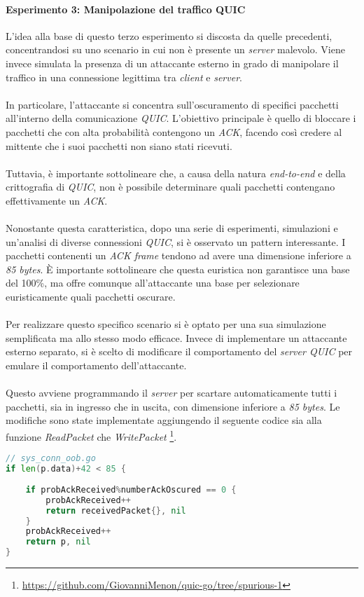 \paragraph{Esperimento 3: Manipolazione del traffico QUIC }
\noindent L'idea alla base di questo terzo esperimento si discosta da quelle precedenti, concentrandosi su uno scenario in cui non è presente un \emph{server} malevolo.
Viene invece simulata la presenza di un attaccante esterno in grado di manipolare il traffico in una connessione legittima tra \emph{client} e \emph{server}.
\\\\
In particolare, l'attaccante si concentra sull'oscuramento di specifici pacchetti all'interno della comunicazione \emph{QUIC}. 
L'obiettivo principale è quello di bloccare i pacchetti che con alta probabilità contengono un \emph{ACK}, facendo così credere al mittente che i suoi pacchetti non siano stati ricevuti.
\\\\
Tuttavia, è importante sottolineare che, a causa della natura \emph{end-to-end} e della crittografia di \emph{QUIC}, non è possibile determinare quali pacchetti contengano effettivamente un \emph{ACK}.
\\\\
Nonostante questa caratteristica, dopo una serie di esperimenti, simulazioni e un'analisi di diverse connessioni \emph{QUIC}, si è osservato un pattern interessante. I pacchetti contenenti un \emph{ACK frame} tendono ad avere una dimensione inferiore a \emph{85 bytes}.
È importante sottolineare che questa euristica non garantisce una base del 100\%, ma offre comunque all'attaccante una base per selezionare euristicamente quali pacchetti oscurare.
\\\\
Per realizzare questo specifico scenario si è optato per una sua simulazione semplificata ma allo stesso modo efficace. 
Invece di implementare un attaccante esterno separato, si è scelto di modificare il comportamento del \emph{server QUIC} per emulare il comportamento dell'attaccante.
\\\\
Questo avviene programmando il \emph{server} per scartare automaticamente tutti i pacchetti, sia in ingresso che in uscita, con dimensione inferiore a \emph{85 bytes}.
Le modifiche sono state implementate aggiungendo il seguente codice sia alla funzione \emph{ReadPacket} che \emph{WritePacket} \footnote{\url{https://github.com/GiovanniMenon/quic-go/tree/spurious-1}}.
\begin{lstlisting}[language=Go]
// sys_conn_oob.go
if len(p.data)+42 < 85 {
	
	if probAckReceived%numberAckOscured == 0 {
		probAckReceived++
		return receivedPacket{}, nil
	}
	probAckReceived++
	return p, nil
}
\end{lstlisting}

